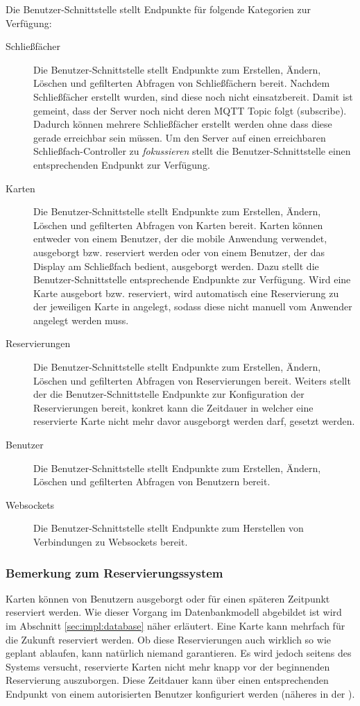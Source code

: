 \noindent
Die Benutzer-Schnittstelle stellt Endpunkte für folgende Kategorien zur Verfügung:
\begin{description}
\item[Schließfächer ] Die Benutzer-Schnittstelle stellt Endpunkte zum Erstellen, Ändern, Löschen und gefilterten Abfragen von Schließfächern bereit. Nachdem Schließfächer erstellt wurden, sind diese noch nicht einsatzbereit. Damit ist gemeint, dass der Server noch nicht deren MQTT Topic folgt (subscribe). Dadurch können mehrere Schließfächer erstellt werden ohne dass diese gerade erreichbar sein müssen. Um den Server auf einen erreichbaren Schließfach-Controller zu \textit{fokussieren} stellt die Benutzer-Schnittstelle einen entsprechenden Endpunkt zur Verfügung.
\item[Karten ] Die Benutzer-Schnittstelle stellt Endpunkte zum Erstellen, Ändern, Löschen und gefilterten Abfragen von Karten bereit. Karten können entweder von einem Benutzer, der die mobile Anwendung verwendet, ausgeborgt bzw. reserviert werden oder von einem Benutzer, der das Display am Schließfach bedient, ausgeborgt werden. Dazu stellt die Benutzer-Schnittstelle entsprechende Endpunkte zur Verfügung. Wird eine Karte ausgebort bzw. reserviert, wird automatisch eine Reservierung zu der jeweiligen Karte in angelegt, sodass diese nicht manuell vom Anwender angelegt werden muss. 
\item[Reservierungen ] Die Benutzer-Schnittstelle stellt Endpunkte zum Erstellen, Ändern, Löschen und gefilterten Abfragen von Reservierungen bereit. Weiters stellt der die Benutzer-Schnittstelle Endpunkte zur Konfiguration der Reservierungen bereit, konkret kann die Zeitdauer in welcher eine reservierte Karte nicht mehr davor ausgeborgt werden darf, gesetzt werden.
\item[Benutzer ] Die Benutzer-Schnittstelle stellt Endpunkte zum Erstellen, Ändern, Löschen und gefilterten Abfragen von Benutzern bereit.
\item[Websockets ] Die Benutzer-Schnittstelle stellt Endpunkte zum Herstellen von Verbindungen zu Websockets bereit.
\end{description}

\subsubsection{Bemerkung zum Reservierungssystem}
Karten können von Benutzern ausgeborgt oder für einen späteren Zeitpunkt reserviert werden. Wie dieser Vorgang im Datenbankmodell abgebildet ist wird im Abschnitt \ref{sec:impl:database}  näher erläutert. Eine Karte kann mehrfach für die Zukunft reserviert werden. Ob diese Reservierungen auch wirklich so wie geplant ablaufen, kann natürlich niemand garantieren. Es wird jedoch seitens des Systems versucht, reservierte Karten nicht mehr knapp vor der beginnenden Reservierung auszuborgen. Diese Zeitdauer kann über einen entsprechenden Endpunkt von einem autorisierten Benutzer konfiguriert werden (näheres in der ).

